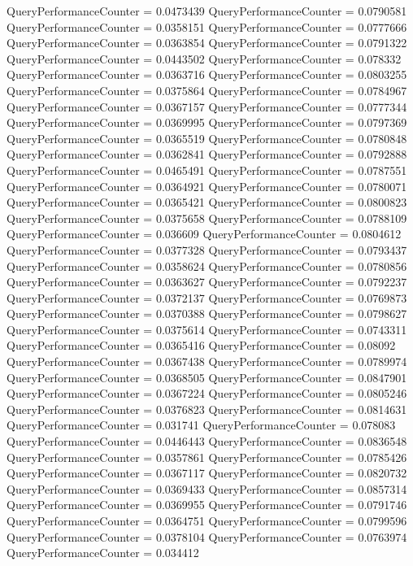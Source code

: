 \documentclass[9pt]{article}
\theoremstyle{plain}
\theoremstyle{definition}
\theoremstyle{remark}
\numberwithin{equation}{section}
\begin{document}
QueryPerformanceCounter  =  0.0473439
QueryPerformanceCounter  =  0.0790581
QueryPerformanceCounter  =  0.0358151
QueryPerformanceCounter  =  0.0777666
QueryPerformanceCounter  =  0.0363854
QueryPerformanceCounter  =  0.0791322
QueryPerformanceCounter  =  0.0443502
QueryPerformanceCounter  =  0.078332
QueryPerformanceCounter  =  0.0363716
QueryPerformanceCounter  =  0.0803255
QueryPerformanceCounter  =  0.0375864
QueryPerformanceCounter  =  0.0784967
QueryPerformanceCounter  =  0.0367157
QueryPerformanceCounter  =  0.0777344
QueryPerformanceCounter  =  0.0369995
QueryPerformanceCounter  =  0.0797369
QueryPerformanceCounter  =  0.0365519
QueryPerformanceCounter  =  0.0780848
QueryPerformanceCounter  =  0.0362841
QueryPerformanceCounter  =  0.0792888
QueryPerformanceCounter  =  0.0465491
QueryPerformanceCounter  =  0.0787551
QueryPerformanceCounter  =  0.0364921
QueryPerformanceCounter  =  0.0780071
QueryPerformanceCounter  =  0.0365421
QueryPerformanceCounter  =  0.0800823
QueryPerformanceCounter  =  0.0375658
QueryPerformanceCounter  =  0.0788109
QueryPerformanceCounter  =  0.036609
QueryPerformanceCounter  =  0.0804612
QueryPerformanceCounter  =  0.0377328
QueryPerformanceCounter  =  0.0793437
QueryPerformanceCounter  =  0.0358624
QueryPerformanceCounter  =  0.0780856
QueryPerformanceCounter  =  0.0363627
QueryPerformanceCounter  =  0.0792237
QueryPerformanceCounter  =  0.0372137
QueryPerformanceCounter  =  0.0769873
QueryPerformanceCounter  =  0.0370388
QueryPerformanceCounter  =  0.0798627
QueryPerformanceCounter  =  0.0375614
QueryPerformanceCounter  =  0.0743311
QueryPerformanceCounter  =  0.0365416
QueryPerformanceCounter  =  0.08092
QueryPerformanceCounter  =  0.0367438
QueryPerformanceCounter  =  0.0789974
QueryPerformanceCounter  =  0.0368505
QueryPerformanceCounter  =  0.0847901
QueryPerformanceCounter  =  0.0367224
QueryPerformanceCounter  =  0.0805246
QueryPerformanceCounter  =  0.0376823
QueryPerformanceCounter  =  0.0814631
QueryPerformanceCounter  =  0.031741
QueryPerformanceCounter  =  0.078083
QueryPerformanceCounter  =  0.0446443
QueryPerformanceCounter  =  0.0836548
QueryPerformanceCounter  =  0.0357861
QueryPerformanceCounter  =  0.0785426
QueryPerformanceCounter  =  0.0367117
QueryPerformanceCounter  =  0.0820732
QueryPerformanceCounter  =  0.0369433
QueryPerformanceCounter  =  0.0857314
QueryPerformanceCounter  =  0.0369955
QueryPerformanceCounter  =  0.0791746
QueryPerformanceCounter  =  0.0364751
QueryPerformanceCounter  =  0.0799596
QueryPerformanceCounter  =  0.0378104
QueryPerformanceCounter  =  0.0763974
QueryPerformanceCounter  =  0.034412
\end{document}
